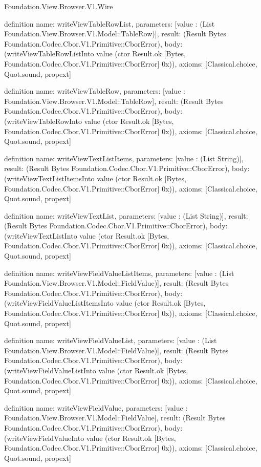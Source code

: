 \begin{lexlean}{Foundation.View.Browser.V1.Wire}
\begin{semanticmodule}
definition{
  name: writeViewTableRowList,
  parameters: [value : (List Foundation.View.Browser.V1.Model::TableRow)],
  result: (Result Bytes Foundation.Codec.Cbor.V1.Primitive::CborError),
  body: (writeViewTableRowListInto value (ctor Result.ok [Bytes, Foundation.Codec.Cbor.V1.Primitive::CborError] 0x)),
  axioms: [Classical.choice, Quot.sound, propext]
}

definition{
  name: writeViewTableRow,
  parameters: [value : Foundation.View.Browser.V1.Model::TableRow],
  result: (Result Bytes Foundation.Codec.Cbor.V1.Primitive::CborError),
  body: (writeViewTableRowInto value (ctor Result.ok [Bytes, Foundation.Codec.Cbor.V1.Primitive::CborError] 0x)),
  axioms: [Classical.choice, Quot.sound, propext]
}

definition{
  name: writeViewTextListItems,
  parameters: [value : (List String)],
  result: (Result Bytes Foundation.Codec.Cbor.V1.Primitive::CborError),
  body: (writeViewTextListItemsInto value (ctor Result.ok [Bytes, Foundation.Codec.Cbor.V1.Primitive::CborError] 0x)),
  axioms: [Classical.choice, Quot.sound, propext]
}

definition{
  name: writeViewTextList,
  parameters: [value : (List String)],
  result: (Result Bytes Foundation.Codec.Cbor.V1.Primitive::CborError),
  body: (writeViewTextListInto value (ctor Result.ok [Bytes, Foundation.Codec.Cbor.V1.Primitive::CborError] 0x)),
  axioms: [Classical.choice, Quot.sound, propext]
}

definition{
  name: writeViewFieldValueListItems,
  parameters: [value : (List Foundation.View.Browser.V1.Model::FieldValue)],
  result: (Result Bytes Foundation.Codec.Cbor.V1.Primitive::CborError),
  body: (writeViewFieldValueListItemsInto value (ctor Result.ok [Bytes, Foundation.Codec.Cbor.V1.Primitive::CborError] 0x)),
  axioms: [Classical.choice, Quot.sound, propext]
}

definition{
  name: writeViewFieldValueList,
  parameters: [value : (List Foundation.View.Browser.V1.Model::FieldValue)],
  result: (Result Bytes Foundation.Codec.Cbor.V1.Primitive::CborError),
  body: (writeViewFieldValueListInto value (ctor Result.ok [Bytes, Foundation.Codec.Cbor.V1.Primitive::CborError] 0x)),
  axioms: [Classical.choice, Quot.sound, propext]
}

definition{
  name: writeViewFieldValue,
  parameters: [value : Foundation.View.Browser.V1.Model::FieldValue],
  result: (Result Bytes Foundation.Codec.Cbor.V1.Primitive::CborError),
  body: (writeViewFieldValueInto value (ctor Result.ok [Bytes, Foundation.Codec.Cbor.V1.Primitive::CborError] 0x)),
  axioms: [Classical.choice, Quot.sound, propext]
}


\end{semanticmodule}
\end{lexlean}
